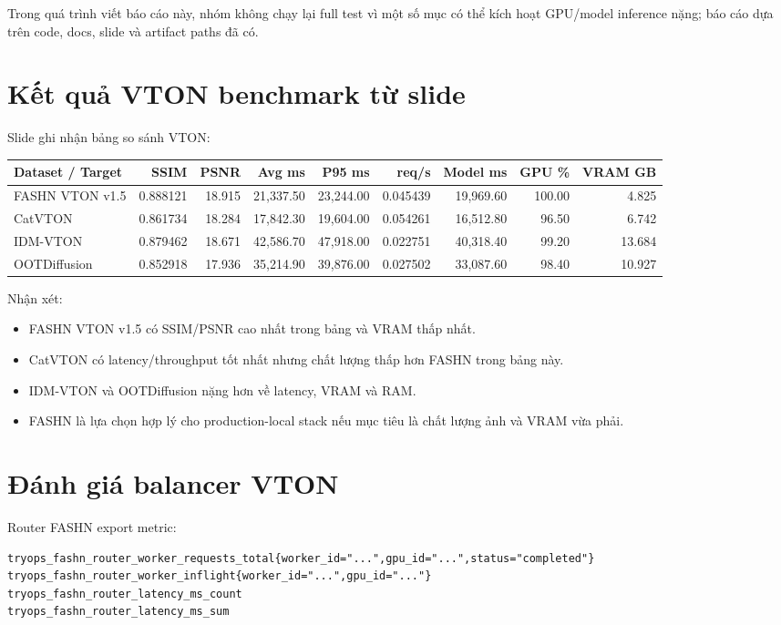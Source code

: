 \documentclass[12pt,a4paper,oneside]{report}
\newcommand{\code}[1]{\texttt{\detokenize{#1}}}
\begin{document}
Trong quá trình viết báo cáo này, nhóm không chạy lại full test vì một số mục có thể kích hoạt GPU/model inference nặng; báo cáo dựa trên code, docs, slide và artifact paths đã có.

\section{Kết quả VTON benchmark từ slide}

Slide \code{slide/main.tex} ghi nhận bảng so sánh VTON:

\begin{longtable}{p{3.3cm}rrrrrrrr}
\toprule
\textbf{Dataset / Target} & \textbf{SSIM} & \textbf{PSNR} & \textbf{Avg ms} & \textbf{P95 ms} & \textbf{req/s} & \textbf{Model ms} & \textbf{GPU \%} & \textbf{VRAM GB} \\
\midrule
FASHN VTON v1.5 & 0.888121 & 18.915 & 21,337.50 & 23,244.00 & 0.045439 & 19,969.60 & 100.00 & 4.825 \\
CatVTON & 0.861734 & 18.284 & 17,842.30 & 19,604.00 & 0.054261 & 16,512.80 & 96.50 & 6.742 \\
IDM-VTON & 0.879462 & 18.671 & 42,586.70 & 47,918.00 & 0.022751 & 40,318.40 & 99.20 & 13.684 \\
OOTDiffusion & 0.852918 & 17.936 & 35,214.90 & 39,876.00 & 0.027502 & 33,087.60 & 98.40 & 10.927 \\
\bottomrule
\end{longtable}

Nhận xét:

\begin{itemize}
  \item FASHN VTON v1.5 có SSIM/PSNR cao nhất trong bảng và VRAM thấp nhất.
  \item CatVTON có latency/throughput tốt nhất nhưng chất lượng thấp hơn FASHN trong bảng này.
  \item IDM-VTON và OOTDiffusion nặng hơn về latency, VRAM và RAM.
  \item FASHN là lựa chọn hợp lý cho production-local stack nếu mục tiêu là chất lượng ảnh và VRAM vừa phải.
\end{itemize}

\section{Đánh giá balancer VTON}

Router FASHN export metric:

\begin{lstlisting}
tryops_fashn_router_worker_requests_total{worker_id="...",gpu_id="...",status="completed"}
tryops_fashn_router_worker_inflight{worker_id="...",gpu_id="..."}
tryops_fashn_router_latency_ms_count
tryops_fashn_router_latency_ms_sum
\end{lstlisting}
\end{document}
